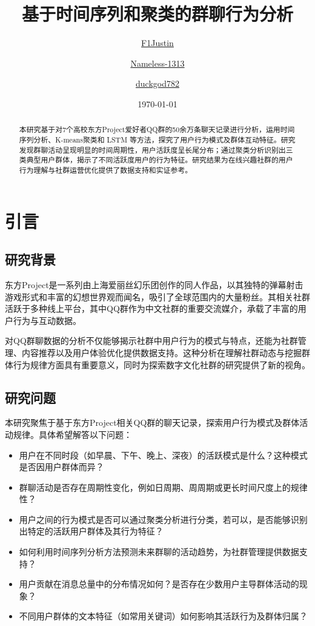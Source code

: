 \documentclass{paper}
\begin{document}
\title{基于时间序列和聚类的群聊行为分析}
\author{\href{https://github.com/F1Justin}{F1Justin} \and\href{https://github.com/Nameless-1313}{Nameless-1313} \and \href{https://github.com/duckgod782}{duckgod782}}
\date{\today}

\maketitle

\begin{abstract}
    本研究基于对7个高校东方Project爱好者QQ群的50余万条聊天记录进行分析，运用时间序列分析、K-means聚类和 LSTM 等方法，探究了用户行为模式及群体互动特征。研究发现群聊活动呈现明显的时间周期性，用户活跃度呈长尾分布；通过聚类分析识别出三类典型用户群体，揭示了不同活跃度用户的行为特征。研究结果为在线兴趣社群的用户行为理解与社群运营优化提供了数据支持和实证参考。
\end{abstract}

\setcounter{tocdepth}{2}
\tableofcontents

\section{引言}
\subsection{研究背景}
东方Project是一系列由上海爱丽丝幻乐团创作的同人作品，以其独特的弹幕射击游戏形式和丰富的幻想世界观而闻名，吸引了全球范围内的大量粉丝。其相关社群活跃于多种线上平台，其中QQ群作为中文社群的重要交流媒介，承载了丰富的用户行为与互动数据。

对QQ群聊数据的分析不仅能够揭示社群中用户行为的模式与特点，还能为社群管理、内容推荐以及用户体验优化提供数据支持。这种分析在理解社群动态与挖掘群体行为规律方面具有重要意义，同时为探索数字文化社群的研究提供了新的视角。

\subsection{研究问题}
本研究聚焦于基于东方Project相关QQ群的聊天记录，探索用户行为模式及群体活动规律。具体希望解答以下问题：

\begin{itemize}
    \item 用户在不同时段（如早晨、下午、晚上、深夜）的活跃模式是什么？这种模式是否因用户群体而异？
    \item 群聊活动是否存在周期性变化，例如日周期、周周期或更长时间尺度上的规律性？
    \item 用户之间的行为模式是否可以通过聚类分析进行分类，若可以，是否能够识别出特定的活跃用户群体及其行为特征？
    \item 如何利用时间序列分析方法预测未来群聊的活动趋势，为社群管理提供数据支持？
    \item 用户贡献在消息总量中的分布情况如何？是否存在少数用户主导群体活动的现象？
    \item 不同用户群体的文本特征（如常用关键词）如何影响其活跃行为及群体归属？
\end{itemize}
\end{document}
